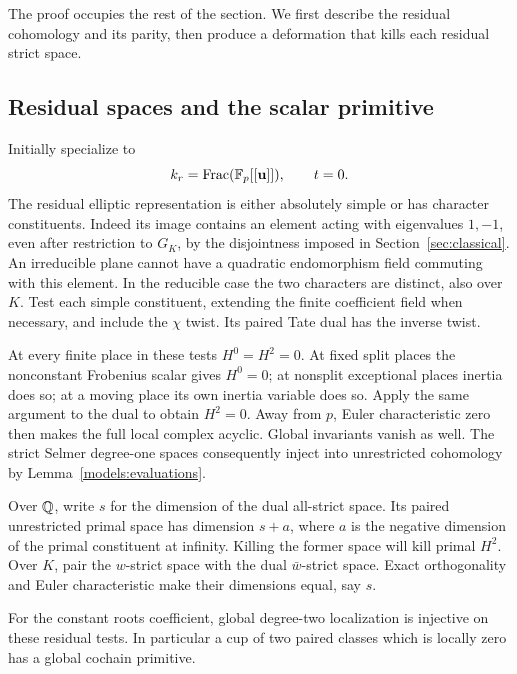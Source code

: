The proof occupies the rest of the section.  We first describe the
residual cohomology and its parity, then produce a deformation that
kills each residual strict space.

\subsection{Residual spaces and the scalar primitive}

Initially specialize to
\[
 k_r=\operatorname{Frac}(\mathbb F_p[[\mathbf u]]),\qquad t=0.
\]
The residual elliptic representation is either absolutely simple or
has character constituents.  Indeed its image contains an element
acting with eigenvalues $1,-1$, even after restriction to $G_K$,
by the disjointness imposed in Section~\ref{sec:classical}.  An
irreducible plane cannot have a quadratic endomorphism field
commuting with this element.  In the reducible case the two
characters are distinct, also over $K$.  Test each simple
constituent, extending the finite coefficient field when necessary,
and include the $\chi$ twist.  Its paired Tate dual has the inverse
twist.

At every finite place in these tests $H^0=H^2=0$.  At fixed split
places the nonconstant Frobenius scalar gives $H^0=0$; at nonsplit
exceptional places inertia does so; at a moving place its own
inertia variable does so.  Apply the same argument to the dual to
obtain $H^2=0$.  Away from $p$, Euler characteristic zero then
makes the full local complex acyclic.  Global invariants vanish
as well.  The strict Selmer degree-one spaces consequently inject
into unrestricted cohomology by Lemma~\ref{models:evaluations}.

Over $\mathbb Q$, write $s$ for the dimension of the dual all-strict
space.  Its paired unrestricted primal space has dimension $s+a$,
where $a$ is the negative dimension of the primal constituent at
infinity.  Killing the former space will kill primal $H^2$.
Over $K$, pair the $w$-strict space with the dual $\bar w$-strict
space.  Exact orthogonality and Euler characteristic make their
dimensions equal, say $s$.

\begin{lemma}\label{vertical:scalar-localization}
For the constant roots coefficient, global degree-two localization
is injective on these residual tests.  In particular a cup of two
paired classes which is locally zero has a global cochain primitive.
\end{lemma}

